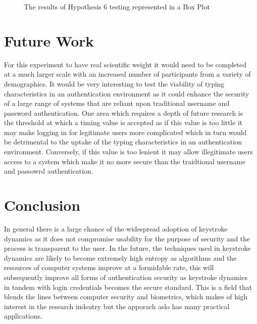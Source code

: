 \documentclass{article}
\begin{document}
\begin{figure} [H]
    \centering
    \caption{The results of Hypothesis 6 testing represented in a Box Plot}
    \label{fig:boxPlotHyp6}
\end{figure}


\section{Future Work}
For this experiment to have real scientific weight it would need to be completed at a much larger scale with an increased number of participants from a variety of demographics. It would be very interesting to test the viability of typing characteristics in an authentication environment as it could enhance the security of a large range of systems that are reliant upon traditional username and password authentication. One area which requires a depth of future research is the threshold at which a timing value is accepted as if this value is too little it may make logging in for legitimate users more complicated which in turn would be detrimental to the uptake of the typing characteristics in an authentication environment. Conversely, if this value is too lenient it may allow illegitimate users access to a system which make it no more secure than the traidtional username and passowrd authentication. 

\section{Conclusion}

In general there is a large chance of the widespread adoption of keystroke dynamics as it does not compromise usability for the purpose of security and the process is transparent to the user. In the future, the techniques used in keystroke dynamics are likely to become extremely high entropy as algorithms and the resources of computer systems improve at a formidable rate, this will subsequently improve all forms of authentication security as keystroke dynamics in tandem with login credentials becomes the secure standard. This is a field that blends the lines between computer security and biometrics, which makes of high interest in the research indsutry but the apporach aslo has many practical applications.  
\end{document}
